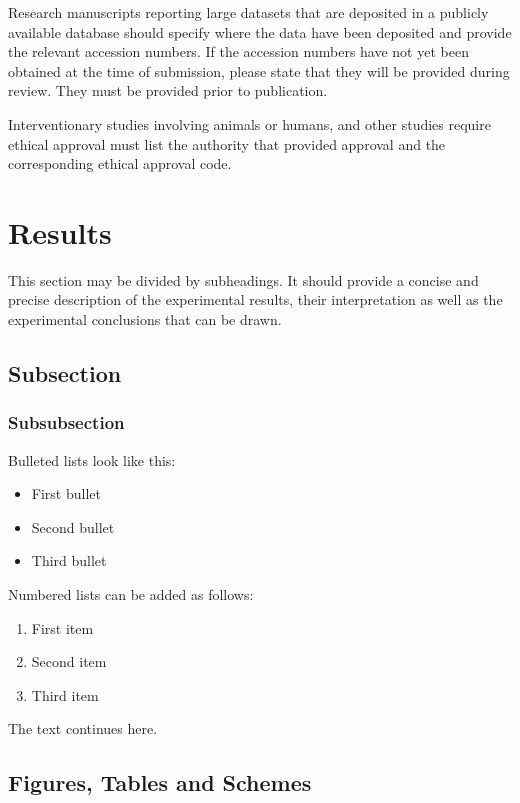 \documentclass[bioengineering,article,submit,moreauthors,pdftex,10pt,a4paper]{mdpi}
\begin{document}
Research manuscripts reporting large datasets that are deposited in a publicly available database should specify where the data have been deposited and provide the relevant accession numbers. If the accession numbers have not yet been obtained at the time of submission, please state that they will be provided during review. They must be provided prior to publication.

Interventionary studies involving animals or humans, and other studies require ethical approval must list the authority that provided approval and the corresponding ethical approval code. 
 
 
\section{Results}

This section may be divided by subheadings. It should provide a concise and precise description of the experimental results, their interpretation as well as the experimental conclusions that can be drawn.


\subsection{Subsection}

\subsubsection{Subsubsection}

Bulleted lists look like this:
\begin{itemize}[leftmargin=*,labelsep=5.8mm]
\item	First bullet
\item	Second bullet
\item	Third bullet
\end{itemize}

Numbered lists can be added as follows:
\begin{enumerate}[leftmargin=*,labelsep=4.9mm]
\item	First item 
\item	Second item
\item	Third item
\end{enumerate}

The text continues here.

\subsection{Figures, Tables and Schemes}
\end{document}
